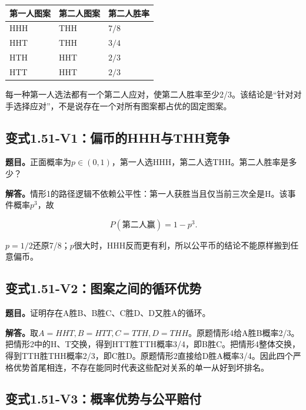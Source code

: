 \documentclass[
  11pt,
  a4paper,
  UTF8,
  fontset=fandol]{ctexart}
\begin{document}
\begin{longtable}[]{@{}lll@{}}
\toprule\noalign{}
第一人图案 & 第二人图案 & 第二人胜率 \\
\midrule\noalign{}
\endhead
\bottomrule\noalign{}
\endlastfoot
HHH & THH & \(7/8\) \\
HHT & THH & \(3/4\) \\
HTH & HHT & \(2/3\) \\
HTT & HHT & \(2/3\) \\
\end{longtable}

每一种第一人选法都有一个第二人应对，使第二人胜率至少2/3。该结论是``针对对手选择应对''，不是说存在一个对所有图案都占优的固定图案。

\subsection{变式1.51-V1：偏币的HHH与THH竞争}\label{ux53d8ux5f0f1.51-v1ux504fux5e01ux7684hhhux4e0ethhux7adeux4e89}

\textbf{题目。}正面概率为\(p\in(0,1)\)，第一人选HHH，第二人选THH。第二人胜率是多少？

\textbf{解答。}情形1的路径逻辑不依赖公平性：第一人获胜当且仅当前三次全是H。该事件概率\(p^3\)，故

\[
\boxed{P(\text{第二人赢})=1-p^3.}
\]

\(p=1/2\)还原7/8；\(p\)很大时，HHH反而更有利，所以公平币的结论不能原样搬到任意偏币。

\subsection{变式1.51-V2：图案之间的循环优势}\label{ux53d8ux5f0f1.51-v2ux56feux6848ux4e4bux95f4ux7684ux5faaux73afux4f18ux52bf}

\textbf{题目。}证明存在A胜B、B胜C、C胜D、D又胜A的循环。

\textbf{解答。}取\(A=HHT,B=HTT,C=TTH,D=THH\)。原题情形4给A胜B概率2/3。把情形2中的H、T交换，得到HTT胜TTH概率3/4，即B胜C。把情形4整体交换，得到TTH胜THH概率2/3，即C胜D。原题情形2直接给D胜A概率3/4。因此四个严格优势首尾相连，不存在能同时代表这些配对关系的单一从好到坏排名。

\subsection{变式1.51-V3：概率优势与公平赔付}\label{ux53d8ux5f0f1.51-v3ux6982ux7387ux4f18ux52bfux4e0eux516cux5e73ux8d54ux4ed8}
\end{document}
